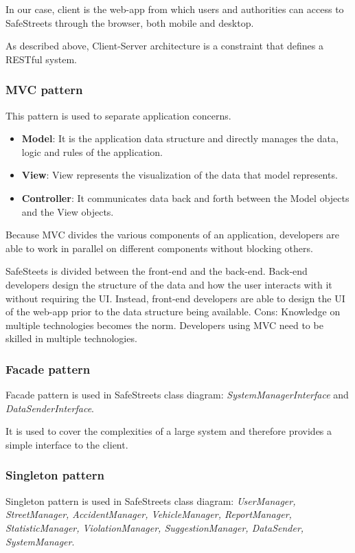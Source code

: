 In our case, client is the web-app from which users and authorities can access to SafeStreets through the browser, both mobile and desktop.

As described above, Client-Server architecture is a constraint that defines a RESTful system.

\subsubsection{MVC pattern}
This pattern is used to separate application concerns.
\begin{itemize}
	\item \textbf{Model}: It is the application data structure and directly manages the data, logic and rules of the application.
	\item \textbf{View}: View represents the visualization of the data that model represents.
	\item \textbf{Controller}: It communicates data back and forth between the Model objects and the View objects.
\end{itemize}

Because MVC divides the various components of an application, developers are able to work in parallel on different components without blocking others. 

SafeSteets is divided between the front-end and the back-end. Back-end developers design the structure of the data and how the user interacts with it without requiring the UI. Instead, front-end developers are able to design the UI of the web-app prior to the data structure being available.
Cons: Knowledge on multiple technologies becomes the norm. Developers using MVC need to be skilled in multiple technologies.

\newpage

\subsubsection{Facade pattern}
Facade pattern is used in SafeStreets class diagram: \textit{SystemManagerInterface} and \textit{DataSenderInterface}.

It is used to cover the complexities of a large system and therefore provides a simple interface to the client. 


\subsubsection{Singleton pattern}
Singleton pattern is used in SafeStreets class diagram: \textit{UserManager, StreetManager, AccidentManager, VehicleManager, ReportManager, StatisticManager, ViolationManager, SuggestionManager, DataSender, SystemManager}.

